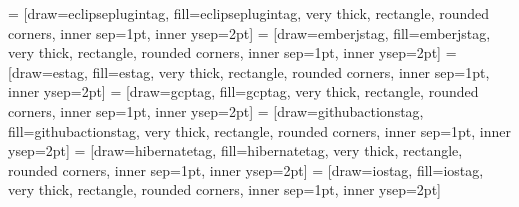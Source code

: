  = [draw=eclipseplugintag, fill=eclipseplugintag, very thick, rectangle, rounded corners, inner sep=1pt, inner ysep=2pt]
\newcommand{\eclipseplugintag}{\begin{tikzpicture}\node [eclipseplugintag] (box){{\scriptsize \textbf{\phantom{|}Plugin Eclipse\phantom{|}}}};\end{tikzpicture}}
 = [draw=emberjstag, fill=emberjstag, very thick, rectangle, rounded corners, inner sep=1pt, inner ysep=2pt]
\newcommand{\emberjstag}{\begin{tikzpicture}\node [emberjstag] (box){{\scriptsize \color{white}{\textbf{\phantom{|}EmberJS\phantom{|}}}}};\end{tikzpicture}}
 = [draw=estag, fill=estag, very thick, rectangle, rounded corners, inner sep=1pt, inner ysep=2pt]
\newcommand{\estag}{\begin{tikzpicture}\node [estag] (box){{\scriptsize \textbf{\phantom{|}ElasticSearch\phantom{|}}}};\end{tikzpicture}}
 = [draw=gcptag, fill=gcptag, very thick, rectangle, rounded corners, inner sep=1pt, inner ysep=2pt]
\newcommand{\gcptag}{\begin{tikzpicture}\node [gcptag] (box){{\scriptsize \color{white}{\textbf{\phantom{|}GCP\phantom{|}}}}};\end{tikzpicture}}
 = [draw=githubactionstag, fill=githubactionstag, very thick, rectangle, rounded corners, inner sep=1pt, inner ysep=2pt]
\newcommand{\githubactionstag}{\begin{tikzpicture}\node [githubactionstag] (box){{\scriptsize \textbf{\phantom{|}Github Actions\phantom{|}}}};\end{tikzpicture}}
 = [draw=hibernatetag, fill=hibernatetag, very thick, rectangle, rounded corners, inner sep=1pt, inner ysep=2pt]
\newcommand{\hibernatetag}{\begin{tikzpicture}\node [hibernatetag] (box){{\scriptsize \textbf{\phantom{|}Hibernate\phantom{|}}}};\end{tikzpicture}}
 = [draw=iostag, fill=iostag, very thick, rectangle, rounded corners, inner sep=1pt, inner ysep=2pt]
